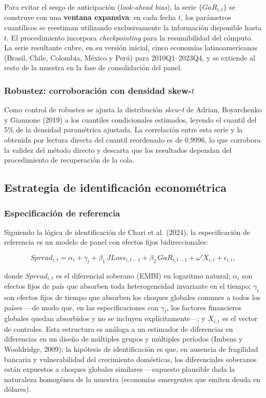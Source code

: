 \documentclass[5p,times,twocolumn,authoryear]{elsarticle}
\begin{document}
Para evitar el sesgo de anticipación (\textit{look-ahead bias}), la serie $\{GaR_{i,t}\}$ se construye con una \textbf{ventana expansiva}: en cada fecha $t$, los parámetros cuantílicos se reestiman utilizando exclusivamente la información disponible hasta $t$. El procedimiento incorpora \textit{checkpointing} para la resumibilidad del cómputo. La serie resultante cubre, en su versión inicial, cinco economías latinoamericanas (Brasil, Chile, Colombia, México y Perú) para 2010Q1–2023Q4, y se extiende al resto de la muestra en la fase de consolidación del panel.

\subsubsection{Robustez: corroboración con densidad skew-$t$}

Como control de robustez se ajusta la distribución \textit{skew-t} de Adrian, Boyarchenko y Giannone (2019) a los cuantiles condicionales estimados, leyendo el cuantil del 5\% de la densidad paramétrica ajustada. La correlación entre esta serie y la obtenida por lectura directa del cuantil reordenado es de 0,9996, lo que corrobora la validez del método directo y descarta que los resultados dependan del procedimiento de recuperación de la cola.

\subsection{Estrategia de identificación econométrica}

\subsubsection{Especificación de referencia}

Siguiendo la lógica de identificación de Chari et al. (2024), la especificación de referencia es un modelo de panel con efectos fijos bidireccionales:

\[ Spread_{i,t} = \alpha_i + \gamma_t + \beta_1\,JLoss_{i,t-1} + \beta_2\,GaR_{i,t-1} + \omega'X_{i,t} + \epsilon_{i,t}, \]

donde $Spread_{i,t}$ es el diferencial soberano (EMBI) en logaritmo natural; $\alpha_i$ son efectos fijos de país que absorben toda heterogeneidad invariante en el tiempo; $\gamma_t$ son efectos fijos de tiempo que absorben los choques globales comunes a todos los países —de modo que, en las especificaciones con $\gamma_t$, los factores financieros globales quedan absorbidos y no se incluyen explícitamente—; y $X_{i,t}$ es el vector de controles. Esta estructura es análoga a un estimador de diferencias en diferencias en un diseño de múltiples grupos y múltiples períodos (Imbens y Wooldridge, 2009); la hipótesis de identificación es que, en ausencia de fragilidad bancaria y vulnerabilidad del crecimiento domésticas, los diferenciales soberanos están expuestos a choques globales similares —supuesto plausible dada la naturaleza homogénea de la muestra (economías emergentes que emiten deuda en dólares).
\end{document}
